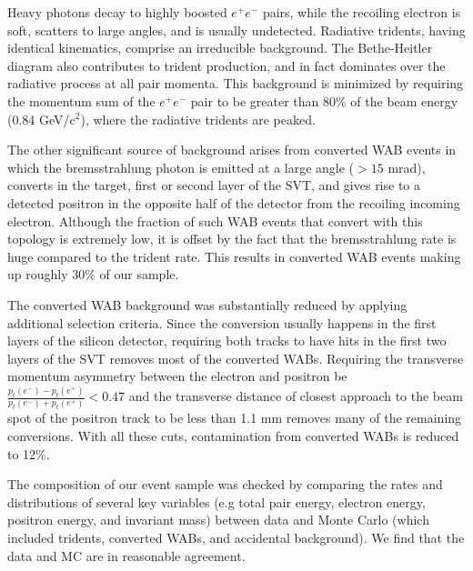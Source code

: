 \documentclass[twocolumn, showpacs, preprintnumbers,prd, superscriptaddress]{revtex4-1}
\newcommand{\gevcc}{GeV/c$^2$}
\newcommand{\pos}{e^{+}}
\newcommand{\ele}{e^{-}}
\newcommand{\epem}{\pos\ele}
\begin{document}
        Heavy photons decay to highly boosted $\epem$ pairs, while the 
        recoiling electron is soft, scatters to large angles, and is usually
        undetected. Radiative tridents, having identical kinematics, comprise
        an irreducible background. The Bethe-Heitler diagram also contributes
        to trident production, and in fact dominates over the radiative process
        at all pair momenta. This background is minimized by requiring the
        momentum sum of the $\epem$ pair to be greater than 80\% of the beam
        energy (0.84 \gevcc), where the radiative tridents are peaked.
        
        The other significant source of background arises from converted WAB 
        events in which the bremsstrahlung photon is emitted at a large angle
        ($>15$ mrad), converts in the target, first or second layer of the SVT, and 
        gives rise to a detected positron in the opposite half of the detector 
        from the recoiling incoming electron. Although the fraction of such 
         WAB events that convert with this topology  is extremely low, 
        it is offset by the fact that 
        the bremsstrahlung rate is huge compared to the trident rate. This 
        results in converted WAB events making up roughly 30\% of our sample.  
        
        The converted WAB background was substantially reduced by applying additional 
        selection criteria. Since the conversion usually happens in the
        first layers of the silicon detector, requiring both tracks to have 
        hits in the first two layers of the SVT removes most of the converted WABs. 
        Requiring the transverse momentum asymmetry between the
        electron and positron be 
        $\frac{p_t(\ele)-p_t(\pos)}{p_t(\ele)+p_t(\pos)}<0.47$ and the 
        transverse distance of closest approach to the beam spot of the 
        positron track to be less 
        than 1.1 mm removes many of the remaining conversions. With all these cuts,
        contamination from converted WABs is reduced to 12\%.  
	
	    The composition of our event sample was checked by comparing the rates
        and distributions of several key variables (e.g total pair energy, 
        electron energy, positron energy, and invariant mass) between data and
        Monte Carlo (which included tridents, converted WABs, and accidental 
        background). We find that the data and MC are in reasonable agreement. 
\end{document}

